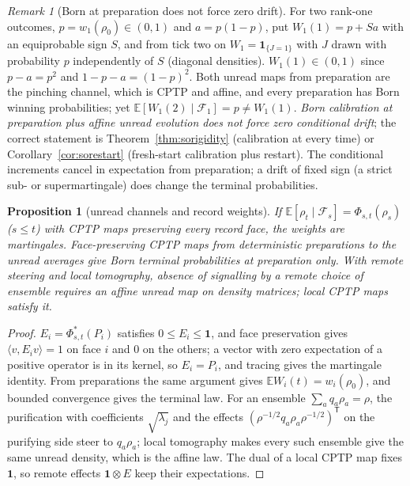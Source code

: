 \documentclass[aps,pra,onecolumn,superscriptaddress,nofootinbib,10pt]{revtex4-2}
\newtheorem{proposition}[theorem]{Proposition}
\theoremstyle{definition}
\theoremstyle{remark}
\newtheorem{remark}[theorem]{Remark}
\newcommand{\ip}[2]{\langle #1,#2\rangle}
\begin{document}
\begin{remark}[Born at preparation does not force zero drift]\label{rem:somemory}
For two rank-one outcomes, $p=w_1(\rho_0)\in(0,1)$ and $a=p(1-p)$, put $W_1(1)=p+Sa$ with an equiprobable sign $S$, and from
tick two on $W_1=\mathbf1_{\{J=1\}}$ with $J$ drawn with probability $p$ independently of $S$ (diagonal densities).
$W_1(1)\in(0,1)$ since $p-a=p^2$ and $1-p-a=(1-p)^2$.  Both unread maps from preparation are the pinching channel, which
is CPTP and affine, and every preparation has Born winning probabilities; yet $\mathbb E[W_1(2)\mid\mathcal F_1]=p\ne W_1(1)$.
\emph{Born calibration at preparation plus affine unread evolution does not force zero conditional drift};
the correct statement is Theorem~\ref{thm:sorigidity} (calibration at every time) or Corollary~\ref{cor:sorestart}
(fresh-start calibration plus restart).  The conditional increments cancel in expectation from preparation;
a drift of fixed sign (a strict sub- or supermartingale) does change the terminal probabilities.
\end{remark}

\begin{proposition}[unread channels and record weights]\label{prop:sochannels}
If $\mathbb E[\rho_t\mid\mathcal F_s]=\Phi_{s,t}(\rho_s)$ ($s\le t$) with CPTP maps preserving every record face, the weights are martingales.
Face-preserving CPTP maps from deterministic preparations to the unread averages give Born terminal
probabilities at preparation only.  With remote steering and local tomography, absence of signalling by
a remote choice of ensemble requires an affine unread map on density matrices; local CPTP maps satisfy
it.
\end{proposition}
\begin{proof}
$E_i=\Phi^*_{s,t}(P_i)$ satisfies $0\le E_i\le\mathbf1$, and face preservation gives $\ip v{E_iv}=1$ on face $i$ and $0$ on the others;
a vector with zero expectation of a positive operator is in its kernel, so $E_i=P_i$, and tracing gives the
martingale identity.  From preparations the same argument gives $\mathbb EW_i(t)=w_i(\rho_0)$, and bounded convergence
gives the terminal law.  For an ensemble $\sum_aq_a\rho_a=\rho$, the purification with coefficients $\sqrt{\lambda_j}$ and the
effects $(\rho^{-1/2}q_a\rho_a\rho^{-1/2})^{\mathsf T}$ on the purifying side steer to $q_a\rho_a$; local tomography makes every such
ensemble give the same unread density, which is the affine law.  The dual of a local CPTP map fixes $\mathbf1$, so
remote effects $\mathbf1\otimes E$ keep their expectations.
\end{proof}
\end{document}

